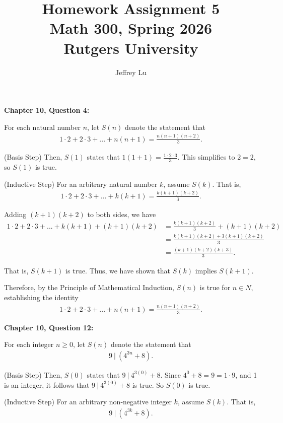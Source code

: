 \documentclass[12pt]{article}
\title{Homework Assignment 5\\ \large Math 300, Spring 2026 \\ Rutgers University}
\author{Jeffrey Lu}
\begin{document}
\maketitle

\noindent \textbf{Chapter 10, Question 4:}

For each natural number $n$, let $S(n)$ denote the statement that
\begin{align*}
    1 \cdot{2} + 2 \cdot{3} + ... + n(n+1) = \frac{n(n+1)(n+2)}{3}.
\end{align*}

(Basis Step) Then, $S(1)$ states that $1(1+1) = \frac{1\cdot{2}\cdot{3}}{3}$.
This simplifies to $2 = 2$, so $S(1)$ is true.

(Inductive Step) For an arbitrary natural number $k$, assume $S(k)$. That is,
\begin{align*}
    1 \cdot{2} + 2 \cdot{3} + ... + k(k+1) = \frac{k(k+1)(k+2)}{3}.
\end{align*}

Adding $(k+1)(k+2)$ to both sides, we have
\begin{align*}
    1 \cdot{2} + 2 \cdot{3} + ... + k(k+1) + (k+1)(k+2) & = \frac{k(k+1)(k+2)}{3} + (k+1)(k+2) \\
                                                        & = \frac{k(k+1)(k+2)+ 3(k+1)(k+2)}{3} \\
                                                        & = \frac{(k+1)(k+2)(k+3)}{3}.
\end{align*}

That is, $S(k+1)$ is true. Thus, we have shown that $S(k)$ implies $S(k+1)$.

Therefore, by the Principle of Mathematical Induction, $S(n)$ is true for $n\in{N}$, establishing the identity
\begin{align*}
    1 \cdot{2} + 2 \cdot{3} + ... + n(n+1) = \frac{n(n+1)(n+2)}{3}.
\end{align*}

\noindent \textbf{Chapter 10, Question 12:}

For each integer $n\geq0$, let $S(n)$ denote the statement that
\begin{align*}
    9 ~|~ (4^{3n}+8).
\end{align*}

(Basis Step) Then, $S(0)$ states that $ 9 ~|~ 4^{3(0)} + 8$.
Since $4^0+8 = 9 = 1 \cdot 9$, and 1 is an integer, it follows that $9 ~|~ 4^{3(0)} + 8$ is true.
So $S(0)$ is true.

(Inductive Step) For an arbitrary non-negative integer $k$, assume $S(k)$. That is,
\begin{align*}
    9 ~|~ (4^{3k}+8).
\end{align*}
\end{document}
